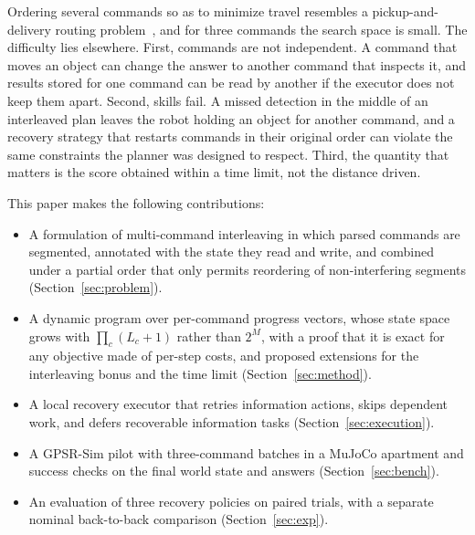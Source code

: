 \documentclass[conference]{IEEEtran}
\newcommand{\todo}[1]{}
\newcommand{\todo}[1]{\textcolor{red}{[TODO: #1]}}
\begin{document}
Ordering several commands so as to minimize travel resembles a
pickup-and-delivery routing problem~\cite{savelsbergh1995,frederickson1978},
and for three commands the search space is small. The difficulty lies
elsewhere. First, commands are not independent. A command that moves an
object can change the answer to another command that inspects it, and
results stored for one command can be read by another if the executor does not
keep them apart. \todo{Measure incorrect answers in simulated batches using
the earlier competition system.} Second, skills fail. A missed detection in the middle
of an interleaved plan leaves the robot holding an object for another command,
and a recovery strategy that restarts commands in their original order can
violate the same constraints the planner was designed to respect. Third, the
quantity that matters is the score obtained within a time limit, not the
distance driven.

\todo{Thing is that before it was purely sequential (Luis)}

This paper makes the following contributions:
\begin{itemize}
  \item A formulation of multi-command interleaving in which parsed commands
    are segmented, annotated with the state they read and write, and combined
    under a partial order that only permits reordering of non-interfering
    segments (Section~\ref{sec:problem}).
  \item A dynamic program over per-command progress vectors, whose state
    space grows with $\prod_c (L_c+1)$ rather than $2^M$, with a proof that it
    is exact for any objective made of per-step costs, and proposed
    extensions for the interleaving bonus and the time limit
    (Section~\ref{sec:method}).
  \item A local recovery executor that retries information actions, skips
    dependent work, and defers recoverable information tasks
    (Section~\ref{sec:execution}).
  \item A GPSR-Sim pilot with three-command batches in a MuJoCo apartment
    and success checks on the final world state and answers
    (Section~\ref{sec:bench}).
  \item An evaluation of three recovery policies on paired trials, with
    a separate nominal back-to-back comparison (Section~\ref{sec:exp}).
\end{itemize}
\todo{Add a teaser figure: merged vs.\ sequential trajectories with a Gantt bar per command.}
\end{document}
